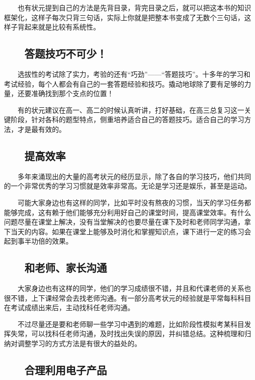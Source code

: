 \documentclass[11pt]{ctexart}
\begin{document}
{{{{　　也有状元提到自己的方法是先背目录，背完目录之后，就可以把这本书的知识框架化，这样子每次只背三句话，实际上你就是把整本书变成了无数个三句话，这样子背起来就是比较有系统性。

\subsection{　　答题技巧不可少！}
\label{sec:orga9e8bd2}

　　选拔性的考试除了实力，考验的还有“巧劲”——“答题技巧”。十多年的学习和考试经验，每个人都会有自己的一套答题经验和技巧。撬动地球除了要有足够的力量，还要准确找到那个支点的位置！

　　有的状元建议在高一、高二的时候认真听讲，打好基础，在高三总复习这一关键阶段，针对各科的题型特点，侧重培养适合自己的答题技巧。适合自己的学习方法，才是最有效的。

\subsection{　　提高效率}
\label{sec:org45076b6}

　　多年来涌现出的大量的高考状元的经历显示，除了各自的学习技巧，他们共同的一个非常优秀的学习习惯就是效率非常高。无论是学习还是娱乐，甚至是运动。

　　可能大家身边也有这样的同学，比如平时没有熬夜的习惯，当天的学习任务都能够完成，这有赖于他们能够充分利用好自己的课堂时间，提高课堂效率。有什么问题尽量在课堂上解决，没有当堂解决的也要尽量在课下及时和老师同学沟通，拿下当天的内容。如果在课堂上能够及时消化和掌握知识点，课下进行一定的练习会起到事半功倍的效果。

\subsection{　　和老师、家长沟通}
\label{sec:orga6b5ecb}

　　大家身边也有这样的同学，他们的学习成绩很不错，并且和代课老师的关系也很不错，上下课经常会去找老师沟通。有一部分高考状元的经验就是平常每科科目在考试成绩出来后，主动找科任老师沟通。

　　不过尽量还是要和老师聊一些学习中遇到的难题，比如阶段性模拟考某科目发挥失常，可以找科任老师沟通，及时找出失误的原因，并纠错总结。这种梳理和归纳对调整学习的方式方法是有很大的益处的。

\subsection{　　合理利用电子产品}
\label{sec:orge28bee9}

}}}}
\end{document}
